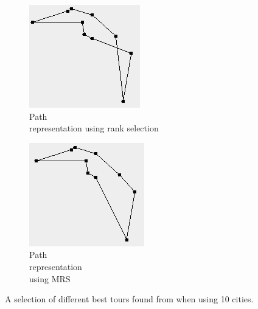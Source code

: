 \documentclass[10pt,a4paper,openbib]{article}
\begin{document}
\begin{multicols}{2}
\begin{figure}[H]
\begin{center}
\begin{subfigure}[b]{0.15\textwidth}
        \includegraphics[width=\textwidth]{images/result1/Pathfalse4.png}
        \caption{Path \\representation using rank selection}
        \label{fig:10citiesPathFalseTour}
    \end{subfigure}
    \begin{subfigure}[b]{0.15\textwidth}
        \includegraphics[width=\textwidth]{images/result1/Pathtrue7.png}
        \caption{Path \\representation \\using MRS}
        \label{fig:10citiesPathFalseTour}
    \end{subfigure}
    \caption{A selection of different best tours found from when using 10 cities.}
    \label{fig:10citiesTours}
\end{center}
\end{figure}



\end{multicols}
\end{document}
